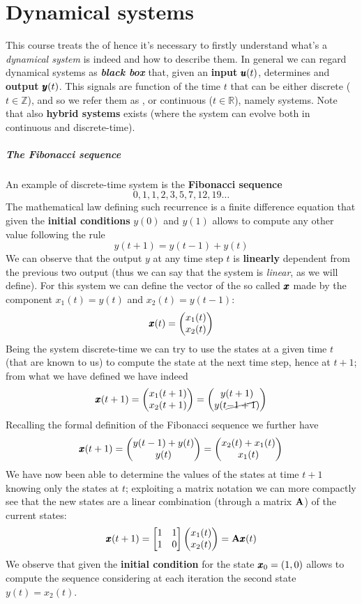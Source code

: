 \chapter{Dynamical systems}
	This course treats the  of  hence it's necessary to firstly understand what's a \textit{dynamical system} is indeed and how to describe them. In general we can regard dynamical systems as \textit{\textbf{black box}} that, given an \textbf{input} $\pmb{u}(t)$, determines and \textbf{output} $\pmb{y}(t)$. This signals are function of the time $t$ that can be either discrete ($t\in \mathds Z$), and so we refer them as , or continuous ($t \in \mathds R$), namely  systems. Note that also \textbf{hybrid systems} exists (where the system can evolve both in continuous and discrete-time).
	
	\paragraph{The Fibonacci sequence} An example of discrete-time system is the \textbf{Fibonacci sequence}
	\[ 0, 1, 1, 2,3, 5, 7, 12, 19\dots \]
	The mathematical law defining such recurrence is a finite difference equation that given the \textbf{initial conditions} $y(0)$ and $y(1)$ allows to compute any other value following the rule
	\[ y(t+1) = y(t-1)+y(t) \]
	We can observe that the output $y$ at any time step $t$ is \textbf{linearly} dependent from the previous two output (thus we can say that the system is \textit{linear}, as we will define). For this system we can define the vector of the so called  $\pmb{x}$ made by the component $x_1(t) = y(t)$ and $x_2(t) = y(t-1)$:
	\[ \pmb{x}(t) = \begin{pmatrix} x_1(t) \\ x_2(t) \end{pmatrix}  \]
	Being the system discrete-time we can try to use the states at a given time $t$ (that are known to us) to compute the state at the next time step, hence at $t+1$; from what we have defined we have indeed
	\[ \pmb{x}(t+1) = \begin{pmatrix} x_1(t+1) \\ x_2(t+1) \end{pmatrix} = \begin{pmatrix} y(t+1) \\ y(t \cancel{-1+1}) \end{pmatrix} \]
	Recalling the formal definition of the Fibonacci sequence we further have
	\[ \pmb{x}(t+1) = \begin{pmatrix} y(t-1) + y(t) \\ y(t) \end{pmatrix} = \begin{pmatrix} x_2(t) + x_1(t) \\ x_1(t) \end{pmatrix} \]
	We have now been able to determine the values of the states at time $t+1$ knowing only the states at $t$; exploiting a matrix notation we can more compactly see that the new states are a linear combination (through a matrix $\mathbf{A}$) of the current states:
	\[ \pmb{x}(t+1) = \begin{bmatrix} 1 & 1 \\ 1 & 0  \end{bmatrix} \begin{pmatrix} x_1(t) \\ x_2(t) \end{pmatrix} = \mathbf{A} \pmb{x}(t) \]
	We observe that given the \textbf{initial condition} for the state $\pmb{x}_0 = (1, 0)$ allows to compute the sequence considering at each iteration the second state $y(t) = x_2(t)$.
	
